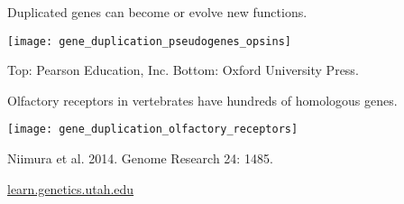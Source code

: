 \documentclass[t]{beamer}
\begin{document}
%
%	 
%	 
%
%	
%	
%	
%
\begin{frame}[t]{Duplicated genes can become  or evolve new functions.}
	
	\texttt{[image: gene\_duplication\_pseudogenes\_opsins]}\\
	
	\vfilll
	 
	\hfill \tiny Top: \textcopyright Pearson Education, Inc. Bottom: \textcopyright Oxford University Press.
\end{frame}
%
\begin{frame}[t]{Olfactory receptors in vertebrates have hundreds of homologous genes.}
	
	\texttt{[image: gene\_duplication\_olfactory\_receptors]}\\
	
	\vfilll
	 
	\hfill \tiny Niimura et al. 2014. Genome Research 24: 1485.
\end{frame}
%
{
\begin{frame}[b]

	\hfill \tiny \href{http://learn.genetics.utah.edu/basics/hoxgenes}{learn.genetics.utah.edu}
\end{frame}
}
\end{document}
